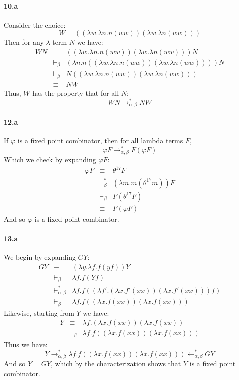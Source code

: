 \documentclass{article}
\begin{document}
\paragraph{10.a}
Consider the choice:
\[ W = ((\lambda w. \lambda n. n (w w) ) ( \lambda w. \lambda n (w w) )) \]
Then for any $\lambda$-term $N$ we have:
\begin{eqnarray*}
W N & = & ((\lambda w. \lambda n. n (w w) ) ( \lambda w. \lambda n (w w) )) N \\
& \vdash_\beta & (\lambda n . n ((\lambda w. \lambda n. n (w w) ) ( \lambda w. \lambda n (w w) ))) N \\
& \vdash_\beta & N ((\lambda w. \lambda n. n (w w) ) ( \lambda w. \lambda n (w w) )) \\
& \equiv & N W
\end{eqnarray*}
Thus, $W$ has the property that for all $N$:
\[ W N \to^*_{\alpha,\beta} N W \]

\paragraph{12.a}
If $\varphi$ is a fixed point combinator, then for all lambda terms $F$,
\[ \varphi F \to^*_{\alpha, \beta} F (\varphi F) \]
Which we check by expanding $\varphi F$:
\begin{eqnarray*}
\varphi F & \equiv & \theta^{17} F \\
& \vdash_\beta^* & (\lambda m . m ( \theta^{17} m)) F \\
& \vdash_\beta & F ( \theta^{17} F) \\
& \equiv & F ( \varphi F)
\end{eqnarray*}
And so $\varphi$ is a fixed-point combinator.

\paragraph{13.a}
We begin by expanding $G Y$:
\begin{eqnarray*}
G Y & \equiv & ( \lambda y . \lambda f . f ( y f ) ) Y \\
& \vdash_\beta & \lambda f . f ( Y f ) \\
& \vdash_{\alpha, \beta}^* & \lambda f . f ( (\lambda f'. ( \lambda x. f'(xx)) ( \lambda x. f'(xx))) f )  \\
& \vdash_\beta & \lambda f . f ( (\lambda x . f(xx)) ( \lambda x. f(xx)) )
\end{eqnarray*}
Likewise, starting from $Y$ we have:
\begin{eqnarray*}
Y & \equiv & \lambda f. (\lambda x. f(xx)) (\lambda x. f(xx)) \\
& \vdash_\beta & \lambda f . f ( (\lambda x. f(xx)) (\lambda x. f(xx)) )
\end{eqnarray*}
Thus we have:
\[ Y \rightarrow^*_{\alpha,\beta} \lambda f . f ( (\lambda x. f(xx)) (\lambda x. f(xx)) ) \leftarrow^*_{\alpha,\beta} G Y \]
And so $Y = GY$, which by the characterization shows that $Y$ is a fixed point combinator.
\end{document}
